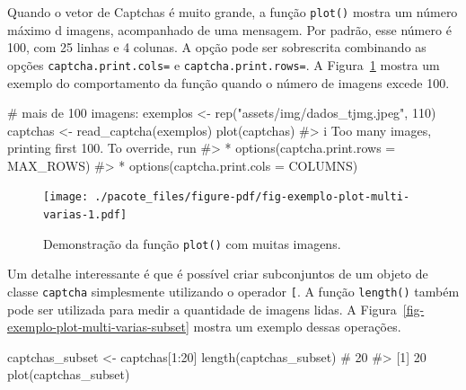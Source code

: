 \documentclass[12pt,twoside,brazilian]{book}
\newenvironment{Shaded}{\begin{snugshade}}{\end{snugshade}}
\newcommand{\CommentTok}[1]{\textcolor[rgb]{0.37,0.37,0.37}{#1}}
\newcommand{\DecValTok}[1]{\textcolor[rgb]{0.68,0.00,0.00}{#1}}
\newcommand{\FunctionTok}[1]{\textcolor[rgb]{0.28,0.35,0.67}{#1}}
\newcommand{\NormalTok}[1]{\textcolor[rgb]{0.00,0.23,0.31}{#1}}
\newcommand{\OtherTok}[1]{\textcolor[rgb]{0.00,0.23,0.31}{#1}}
\newcommand{\SpecialCharTok}[1]{\textcolor[rgb]{0.37,0.37,0.37}{#1}}
\newcommand{\StringTok}[1]{\textcolor[rgb]{0.13,0.47,0.30}{#1}}
\begin{document}
Quando o vetor de Captchas é muito grande, a função \texttt{plot()}
mostra um número máximo d imagens, acompanhado de uma mensagem. Por
padrão, esse número é 100, com 25 linhas e 4 colunas. A opção pode ser
sobrescrita combinando as opções \texttt{captcha.print.cols=} e
\texttt{captcha.print.rows=}. A
Figura~\ref{fig-exemplo-plot-multi-varias} mostra um exemplo do
comportamento da função quando o número de imagens excede 100.

\begin{Shaded}
\begin{Highlighting}[]
\CommentTok{\# mais de 100 imagens:}
\NormalTok{exemplos }\OtherTok{\textless{}{-}} \FunctionTok{rep}\NormalTok{(}\StringTok{"assets/img/dados\_tjmg.jpeg"}\NormalTok{, }\DecValTok{110}\NormalTok{)}
\NormalTok{captchas }\OtherTok{\textless{}{-}} \FunctionTok{read\_captcha}\NormalTok{(exemplos)}
\FunctionTok{plot}\NormalTok{(captchas)}
\CommentTok{\#\textgreater{} i Too many images, printing first 100. To override, run}
\CommentTok{\#\textgreater{} * options(\textquotesingle{}captcha.print.rows\textquotesingle{} = MAX\_ROWS)}
\CommentTok{\#\textgreater{} * options(\textquotesingle{}captcha.print.cols\textquotesingle{} = COLUMNS)}
\end{Highlighting}
\end{Shaded}

\begin{figure}[H]

{\centering \texttt{[image: ./pacote\_files/figure-pdf/fig-exemplo-plot-multi-varias-1.pdf]}

}

\caption{\label{fig-exemplo-plot-multi-varias}Demonstração da função
\texttt{plot()} com muitas imagens.}

\end{figure}

Um detalhe interessante é que é possível criar subconjuntos de um objeto
de classe \texttt{captcha} simplesmente utilizando o operador
\texttt{{[}}. A função \texttt{length()} também pode ser utilizada para
medir a quantidade de imagens lidas. A
Figura~\ref{fig-exemplo-plot-multi-varias-subset} mostra um exemplo
dessas operações.

\begin{Shaded}
\begin{Highlighting}[]
\NormalTok{captchas\_subset }\OtherTok{\textless{}{-}}\NormalTok{ captchas[}\DecValTok{1}\SpecialCharTok{:}\DecValTok{20}\NormalTok{]}
\FunctionTok{length}\NormalTok{(captchas\_subset) }\CommentTok{\# 20}
\CommentTok{\#\textgreater{} [1] 20}
\FunctionTok{plot}\NormalTok{(captchas\_subset)}
\end{Highlighting}
\end{Shaded}
\end{document}
